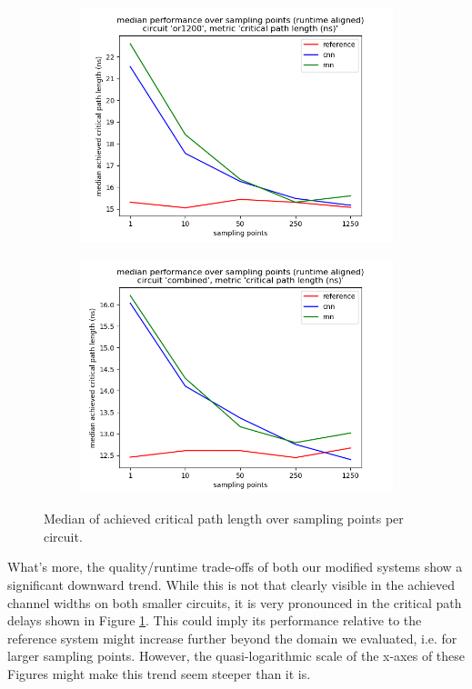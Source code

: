 \begin{figure}
\begin{subfigure}[b]{0.49\linewidth}
	\end{subfigure}
	\begin{subfigure}[b]{0.49\linewidth}
		\includegraphics[width=\linewidth]{plots/eval-or1200-critical-path-median-full.png}
	\end{subfigure}
	\begin{subfigure}[b]{0.49\linewidth}
		\includegraphics[width=\linewidth]{plots/eval-combined-critical-path-median-full.png}
	\end{subfigure}
	\caption{Median of achieved critical path length over sampling points per circuit.}
	\label{fig:eval-critical-path-median}
\end{figure}

What's more, the quality/runtime trade-offs of both our modified systems show a significant downward trend. While this is not that clearly visible in the achieved channel widths on both smaller circuits, it is very pronounced in the critical path delays shown in Figure \ref{fig:eval-critical-path-median}. This could imply its performance relative to the reference system might increase further beyond the domain we evaluated, i.e. for larger sampling points. However, the quasi-logarithmic scale of the x-axes of these Figures might make this trend seem steeper than it is.

